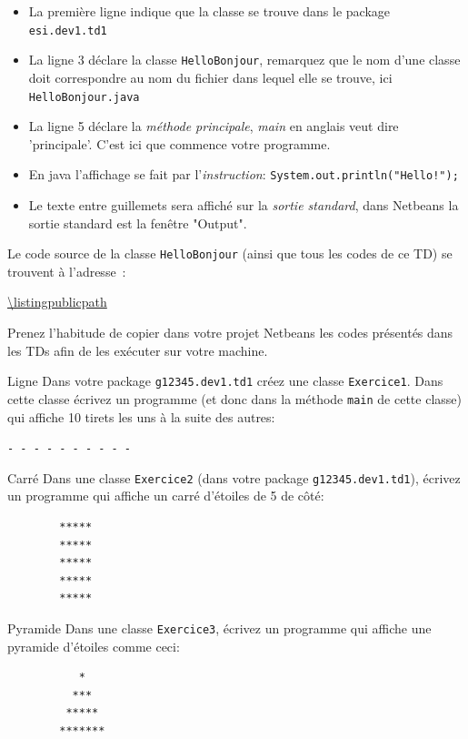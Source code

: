 \documentclass[a4paper,11pt]{style-esi/td}
\begin{document}
\begin{itemize}
	\item La première ligne indique que la classe se trouve dans le package \texttt{esi.dev1.td1}
	\item La ligne 3 déclare la classe \texttt{HelloBonjour}, remarquez que le nom d'une classe
	      doit correspondre au nom du fichier dans lequel elle se trouve, ici \texttt{HelloBonjour.java}
	\item La ligne 5 déclare la \emph{méthode principale}, \emph{main} en anglais veut dire 'principale'.
	      C'est ici que commence votre programme.
	\item En java l'affichage se fait par l'\emph{instruction}: \texttt{System.out.println("Hello!");}
	\item Le texte entre guillemets sera affiché sur la \emph{sortie standard}, dans Netbeans la
	      sortie standard est la fenêtre "Output".
\end{itemize}

Le code source de la classe \texttt{HelloBonjour} (ainsi que tous les codes de ce TD) se trouvent à l'adresse~:

\url{\listingpublicpath}

Prenez l'habitude de copier dans votre projet Netbeans les codes présentés dans les TDs afin de
les exécuter sur votre machine.



\begin{Exercice}{Ligne}
	Dans votre package \texttt{g12345.dev1.td1} créez une classe \texttt{Exercice1}.
	Dans cette classe écrivez un programme  (et donc dans la méthode \texttt{main} de cette classe)
	qui affiche 10 tirets les uns à la suite des autres:

	\texttt{- - - - - - - - - -}
\end{Exercice}

\begin{Exercice}{Carré}
	Dans une classe \texttt{Exercice2} (dans votre package \texttt{g12345.dev1.td1}), écrivez un programme qui affiche un carré d'étoiles de 5 de côté:

	\begin{verbatim}
		*****
		*****
		*****
		*****
		*****
		\end{verbatim}
\end{Exercice}

\begin{Exercice}{Pyramide}
	Dans une classe \texttt{Exercice3}, écrivez un programme qui affiche une pyramide d'étoiles comme ceci:

	\begin{verbatim}
		   *
		  ***
		 *****
		*******
		\end{verbatim}
\end{Exercice}
\end{document}
